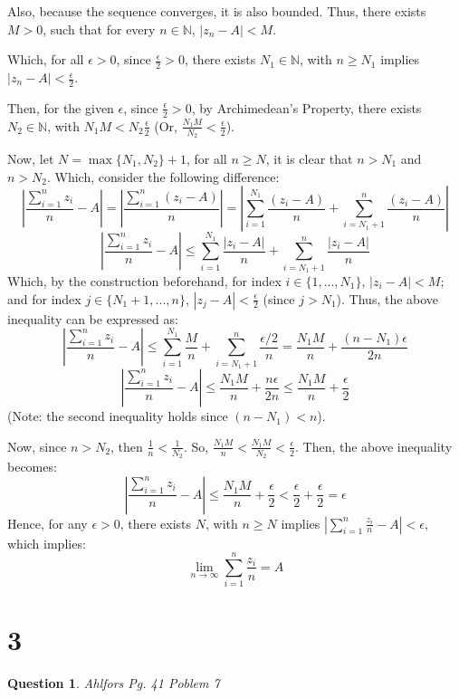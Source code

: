 \documentclass{article}
\newtheorem{question}{Question}
\begin{document}
Also, because the sequence converges, it is also bounded. Thus, there exists $M>0$, such that for every $n\in\mathbb{N}$, $|z_n-A|<M$.

\hfill

Which, for all $\epsilon>0$, since $\frac{\epsilon}{2}>0$, there exists $N_1\in\mathbb{N}$, with $n\geq N_1$ implies $|z_n-A|<\frac{\epsilon}{2}$.

Then, for the given $\epsilon$, since $\frac{\epsilon}{2}>0$, by Archimedean's Property, there exists $N_2\in\mathbb{N}$, with $N_1M<N_2\frac{\epsilon}{2}$
(Or, $\frac{N_1M}{N_2}<\frac{\epsilon}{2}$). 

\hfill

Now, let $N=\max\{N_1,N_2\}+1$, for all $n\geq N$, it is clear that $n>N_1$ and $n>N_2$. Which, consider the following difference:
$$\left|\frac{\sum_{i=1}^{n}z_i}{n}-A\right| = \left|\frac{\sum_{i=1}^{n}(z_i-A)}{n}\right|=\left|\sum_{i=1}^{N_1}\frac{(z_i-A)}{n}+\sum_{i=N_1+1}^{n}\frac{(z_i-A)}{n}\right|$$
$$\left|\frac{\sum_{i=1}^{n}z_i}{n}-A\right|\leq \sum_{i=1}^{N_1}\frac{|z_i-A|}{n}+\sum_{i=N_1+1}^{n}\frac{|z_i-A|}{n}$$
Which, by the construction beforehand, for index $i\in\{1,...,N_1\}$, $|z_i-A|<M$; and for index $j\in\{N_1+1,...,n\}$, $|z_j-A|<\frac{\epsilon}{2}$ (since $j>N_1$).
Thus, the above inequality can be expressed as:
$$\left|\frac{\sum_{i=1}^{n}z_i}{n}-A\right|\leq \sum_{i=1}^{N_1}\frac{M}{n}+\sum_{i=N_1+1}^{n}\frac{\epsilon/2}{n} = \frac{N_1M}{n}+\frac{(n-N_1)\epsilon}{2n}$$
$$\left|\frac{\sum_{i=1}^{n}z_i}{n}-A\right|\leq \frac{N_1M}{n}+\frac{n\epsilon}{2n}\leq \frac{N_1M}{n}+\frac{\epsilon}{2}$$
(Note: the second inequality holds since $(n-N_1)<n$).

Now, since $n>N_2$, then $\frac{1}{n}<\frac{1}{N_2}$. So, $\frac{N_1M}{n}<\frac{N_1M}{N_2}<\frac{\epsilon}{2}$. 
Then, the above inequality becomes:
$$\left|\frac{\sum_{i=1}^{n}z_i}{n}-A\right|\leq \frac{N_1M}{n}+\frac{\epsilon}{2} < \frac{\epsilon}{2}+\frac{\epsilon}{2}=\epsilon$$
Hence, for any $\epsilon>0$, there exists $N$, with $n\geq N$ implies $\left|\sum_{i=1}^{n}\frac{z_i}{n}-A\right|<\epsilon$,
which implies: 
$$\lim_{n\rightarrow \infty}\sum_{i=1}^{n}\frac{z_i}{n}=A$$

\break

\section*{3}
\begin{question}
    Ahlfors Pg. 41 Poblem 7
\end{question}
\end{document}
